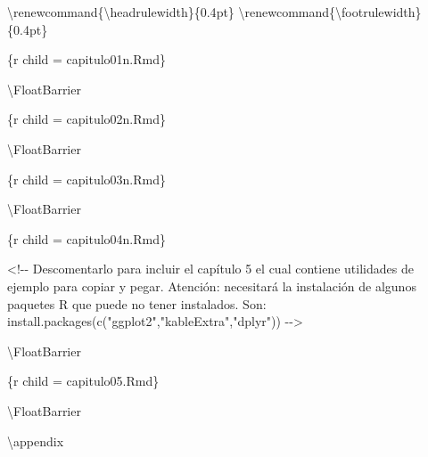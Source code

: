 \documentclass[11pt,a4paper,oneside,]{article}
\newenvironment{Shaded}{\begin{snugshade}}{\end{snugshade}}
\newcommand{\AttributeTok}[1]{\textcolor[rgb]{0.77,0.63,0.00}{#1}}
\newcommand{\DecValTok}[1]{\textcolor[rgb]{0.00,0.00,0.81}{#1}}
\newcommand{\FloatTok}[1]{\textcolor[rgb]{0.00,0.00,0.81}{#1}}
\newcommand{\FunctionTok}[1]{\textcolor[rgb]{0.00,0.00,0.00}{#1}}
\newcommand{\NormalTok}[1]{#1}
\newcommand{\OtherTok}[1]{\textcolor[rgb]{0.56,0.35,0.01}{#1}}
\newcommand{\SpecialCharTok}[1]{\textcolor[rgb]{0.00,0.00,0.00}{#1}}
\newcommand{\StringTok}[1]{\textcolor[rgb]{0.31,0.60,0.02}{#1}}
\numberwithin{dummy}{section}
\theoremstyle{ocrenumbox}
\theoremstyle{blacknumex}
\theoremstyle{blacknumbox}
\theoremstyle{ocrenum}
\theoremstyle{ocrenum}
\begin{document}
\begin{Shaded}
\begin{Highlighting}[numbers=left,,]
\NormalTok{\textbackslash{}renewcommand\{\textbackslash{}headrulewidth\}\{}\FloatTok{0.4}\NormalTok{pt\}}
\NormalTok{\textbackslash{}renewcommand\{\textbackslash{}footrulewidth\}\{}\FloatTok{0.4}\NormalTok{pt\}}

\StringTok{\textasciigrave{}\textasciigrave{}\textasciigrave{}}\AttributeTok{\{r child = \textquotesingle{}capitulo01n.Rmd\textquotesingle{}\}}
\StringTok{\textasciigrave{}\textasciigrave{}\textasciigrave{}}

\NormalTok{\textbackslash{}FloatBarrier}

\StringTok{\textasciigrave{}\textasciigrave{}\textasciigrave{}}\AttributeTok{\{r child = \textquotesingle{}capitulo02n.Rmd\textquotesingle{}\}}
\StringTok{\textasciigrave{}\textasciigrave{}\textasciigrave{}}

\NormalTok{\textbackslash{}FloatBarrier}

\StringTok{\textasciigrave{}\textasciigrave{}\textasciigrave{}}\AttributeTok{\{r child = \textquotesingle{}capitulo03n.Rmd\textquotesingle{}\}}
\StringTok{\textasciigrave{}\textasciigrave{}\textasciigrave{}}

\NormalTok{\textbackslash{}FloatBarrier}

\StringTok{\textasciigrave{}\textasciigrave{}\textasciigrave{}}\AttributeTok{\{r child = \textquotesingle{}capitulo04n.Rmd\textquotesingle{}\}}
\StringTok{\textasciigrave{}\textasciigrave{}\textasciigrave{}}


\SpecialCharTok{\textless{}!{-}{-}} 
\NormalTok{Descomentarlo para incluir el capítulo }\DecValTok{5}\NormalTok{ el cual contiene utilidades de ejemplo}
\NormalTok{para copiar y pegar.}
\NormalTok{Atención}\SpecialCharTok{:}\NormalTok{ necesitará la instalación de algunos paquetes R }
\NormalTok{que puede no tener instalados. Son}\SpecialCharTok{:}
\FunctionTok{install.packages}\NormalTok{(}\FunctionTok{c}\NormalTok{(}\StringTok{"ggplot2"}\NormalTok{,}\StringTok{"kableExtra"}\NormalTok{,}\StringTok{"dplyr"}\NormalTok{))}
\SpecialCharTok{{-}}\OtherTok{{-}\textgreater{}}


\NormalTok{\textbackslash{}FloatBarrier}

\StringTok{\textasciigrave{}\textasciigrave{}\textasciigrave{}}\AttributeTok{\{r child = \textquotesingle{}capitulo05.Rmd\textquotesingle{}\}}
\StringTok{\textasciigrave{}\textasciigrave{}\textasciigrave{}}




\NormalTok{\textbackslash{}FloatBarrier}

\NormalTok{\textbackslash{}appendix}


\end{Highlighting}
\end{Shaded}
\end{document}
